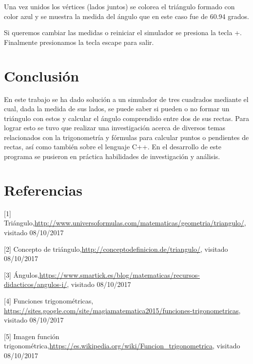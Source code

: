 \documentclass[conference]{IEEEtran}
\begin{document}
Una vez unidos los vértices (lados juntos) se colorea el triángulo formado con color azul y se muestra la medida del ángulo que en este caso fue de 60.94 grados.

Si queremos cambiar las medidas o reiniciar el simulador se presiona la tecla +. Finalmente presionamos la tecla escape para salir.


\section{Conclusión}

En este trabajo se ha dado solución a un simulador de tres cuadrados mediante el cual, dada la medida de sus lados, se puede saber si pueden o no formar un triángulo con estos y calcular el ángulo comprendido entre dos de sus rectas. Para lograr esto se tuvo que realizar una investigación acerca de diversos temas relacionados con la trigonometría y fórmulas para calcular puntos o pendientes de rectas, así como también sobre el lenguaje C++. En el desarrollo de este programa se pusieron en práctica habilidades de investigación y análisis.


\section*{Referencias}
[1] Triángulo,\url{http://www.universoformulas.com/matematicas/geometria/triangulo/}, visitado 08/10/2017

[2] Concepto de triángulo,\url{http://conceptodefinicion.de/triangulo/}, visitado 08/10/2017

[3] Ángulos,\url{https://www.smartick.es/blog/matematicas/recursos-didacticos/angulos-i/}, visitado 08/10/2017

[4] Funciones trigonométricas,\url{ https://sites.google.com/site/magiamatematica2015/funciones-trigonometricas}, visitado 08/10/2017

[5] Imagen función trigonométrica,\url{https://es.wikipedia.org/wiki/Funcion_trigonometrica}, visitado 08/10/2017
\end{document}
